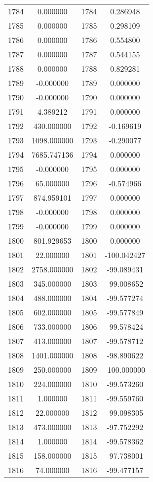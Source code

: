 \documentclass[12pt]{article}
\begin{document}
\begin{longtable}{@{}cccc@{}}
1784 & 0.000000 & 1784 & 0.286948 \\
1785 & 0.000000 & 1785 & 0.298109 \\
1786 & 0.000000 & 1786 & 0.554800 \\
1787 & 0.000000 & 1787 & 0.544155 \\
1788 & 0.000000 & 1788 & 0.829281 \\
1789 & -0.000000 & 1789 & 0.000000 \\
1790 & -0.000000 & 1790 & 0.000000 \\
1791 & 4.389212 & 1791 & 0.000000 \\
1792 & 430.000000 & 1792 & -0.169619 \\
1793 & 1098.000000 & 1793 & -0.290077 \\
1794 & 7685.747136 & 1794 & 0.000000 \\
1795 & -0.000000 & 1795 & 0.000000 \\
1796 & 65.000000 & 1796 & -0.574966 \\
1797 & 874.959101 & 1797 & 0.000000 \\
1798 & -0.000000 & 1798 & 0.000000 \\
1799 & -0.000000 & 1799 & 0.000000 \\
1800 & 801.929653 & 1800 & 0.000000 \\
1801 & 22.000000 & 1801 & -100.042427 \\
1802 & 2758.000000 & 1802 & -99.089431 \\
1803 & 345.000000 & 1803 & -99.008652 \\
1804 & 488.000000 & 1804 & -99.577274 \\
1805 & 602.000000 & 1805 & -99.577849 \\
1806 & 733.000000 & 1806 & -99.578424 \\
1807 & 413.000000 & 1807 & -99.578712 \\
1808 & 1401.000000 & 1808 & -98.890622 \\
1809 & 250.000000 & 1809 & -100.000000 \\
1810 & 224.000000 & 1810 & -99.573260 \\
1811 & 1.000000 & 1811 & -99.559760 \\
1812 & 22.000000 & 1812 & -99.098305 \\
1813 & 473.000000 & 1813 & -97.752292 \\
1814 & 1.000000 & 1814 & -99.578362 \\
1815 & 158.000000 & 1815 & -97.738001 \\
1816 & 74.000000 & 1816 & -99.477157 \\

\end{longtable}
\end{document}
